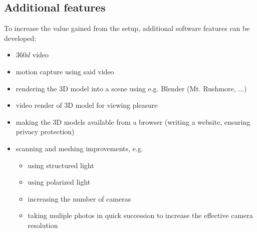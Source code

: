 \subsection{Additional features}
	To increase the value gained from the setup, additional software features can be developed:
	\begin{itemize}
		\item $360d$ video
		\item motion capture using said video
		\item rendering the 3D model into a scene using e.g. Blender (Mt. Rushmore, ...)
		\item video render of 3D model for viewing pleasure
		\item making the 3D models available from a browser (writing a website, ensuring		 privacy protection)
		\item scanning and meshing improvements, e.g.
			\begin{itemize}
				\item using structured light \cite{meshroom_structlight}
				\item using polarized light
				\item increasing the number of cameras
				\item taking muliple photos in quick succession to increase the effective camera resolution
			\end{itemize}
	\end{itemize}
